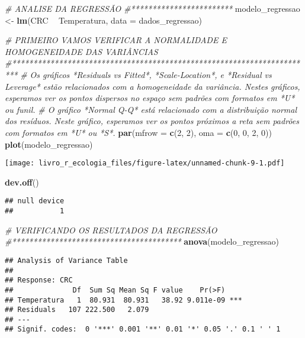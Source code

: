 \documentclass[
]{book}
\newenvironment{Shaded}{\begin{snugshade}}{\end{snugshade}}
\newcommand{\CommentTok}[1]{\textcolor[rgb]{0.56,0.35,0.01}{\textit{#1}}}
\newcommand{\DataTypeTok}[1]{\textcolor[rgb]{0.13,0.29,0.53}{#1}}
\newcommand{\DecValTok}[1]{\textcolor[rgb]{0.00,0.00,0.81}{#1}}
\newcommand{\KeywordTok}[1]{\textcolor[rgb]{0.13,0.29,0.53}{\textbf{#1}}}
\newcommand{\NormalTok}[1]{#1}
\newcommand{\OperatorTok}[1]{\textcolor[rgb]{0.81,0.36,0.00}{\textbf{#1}}}
\newcommand{\StringTok}[1]{\textcolor[rgb]{0.31,0.60,0.02}{#1}}
\begin{document}
\begin{Shaded}
\begin{Highlighting}[]
\CommentTok{# ANALISE DA REGRESSÃO}
\CommentTok{#************************}
\NormalTok{modelo_regressao <-}\StringTok{ }\KeywordTok{lm}\NormalTok{(CRC }\OperatorTok{~}\StringTok{ }\NormalTok{Temperatura, }\DataTypeTok{data =}\NormalTok{ dados_regressao)}

\CommentTok{# PRIMEIRO VAMOS VERIFICAR A NORMALIDADE E HOMOGENEIDADE DAS VARIÂNCIAS}
\CommentTok{#***********************************************************************}
\CommentTok{# Os gráficos *Residuals vs Fitted*, *Scale-Location*, e *Residual vs Leverage* estão relacionados com a homogeneidade da variância. Nestes gráficos, esperamos ver os pontos dispersos no espaço sem padrões com formatos em *U* ou funil. }
\CommentTok{# O gráfico *Normal Q-Q* está relacionado com a distribuição normal dos resíduos. Neste gráfico, esperamos ver os pontos próximos a reta sem padrões com formatos em *U* ou *S*. }
\KeywordTok{par}\NormalTok{(}\DataTypeTok{mfrow =} \KeywordTok{c}\NormalTok{(}\DecValTok{2}\NormalTok{, }\DecValTok{2}\NormalTok{), }\DataTypeTok{oma =} \KeywordTok{c}\NormalTok{(}\DecValTok{0}\NormalTok{, }\DecValTok{0}\NormalTok{, }\DecValTok{2}\NormalTok{, }\DecValTok{0}\NormalTok{))}
\KeywordTok{plot}\NormalTok{(modelo_regressao)}
\end{Highlighting}
\end{Shaded}

\texttt{[image: livro\_r\_ecologia\_files/figure-latex/unnamed-chunk-9-1.pdf]}

\begin{Shaded}
\begin{Highlighting}[]
\KeywordTok{dev.off}\NormalTok{()}
\end{Highlighting}
\end{Shaded}

\begin{verbatim}
## null device 
##           1
\end{verbatim}

\begin{Shaded}
\begin{Highlighting}[]
\CommentTok{# VERIFICANDO OS RESULTADOS DA REGRESSÃO}
\CommentTok{#****************************************}
\KeywordTok{anova}\NormalTok{(modelo_regressao)}
\end{Highlighting}
\end{Shaded}

\begin{verbatim}
## Analysis of Variance Table
## 
## Response: CRC
##              Df  Sum Sq Mean Sq F value    Pr(>F)    
## Temperatura   1  80.931  80.931   38.92 9.011e-09 ***
## Residuals   107 222.500   2.079                      
## ---
## Signif. codes:  0 '***' 0.001 '**' 0.01 '*' 0.05 '.' 0.1 ' ' 1
\end{verbatim}
\end{document}
